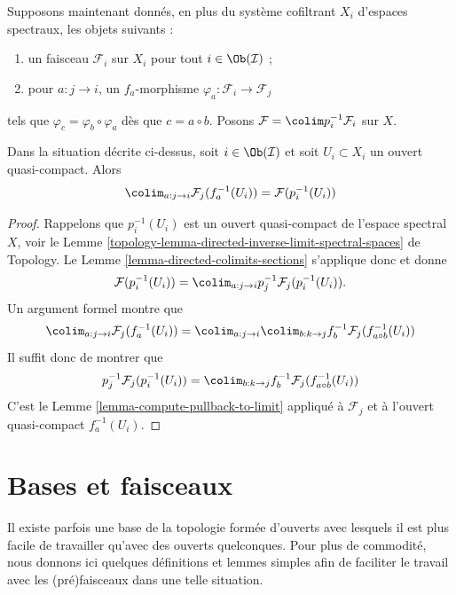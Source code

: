 \noindent
Supposons maintenant donnés, en plus du système cofiltrant $X_i$ d'espaces spectraux,
les objets suivants :
\begin{enumerate}
\item un faisceau $\mathcal{F}_i$ sur $X_i$ pour tout $i \in \Ob(\mathcal{I})$ ;
\item pour $a : j \to i$, un $f_a$-morphisme
$\varphi_a : \mathcal{F}_i \to \mathcal{F}_j$
\end{enumerate}
tels que $\varphi_c = \varphi_b \circ \varphi_a$
dès que $c = a \circ b$. Posons $\mathcal{F} = \colim p_i^{-1}\mathcal{F}_i$
sur $X$.

\begin{lemma}
\label{lemma-descend-opens}
Dans la situation décrite ci-dessus, soit $i \in \Ob(\mathcal{I})$ et soit
$U_i \subset X_i$ un ouvert quasi-compact. Alors
$$
\colim_{a : j \to i} \mathcal{F}_j(f_a^{-1}(U_i)) = \mathcal{F}(p_i^{-1}(U_i))
$$
\end{lemma}

\begin{proof}
Rappelons que $p_i^{-1}(U_i)$ est un ouvert quasi-compact de l'espace spectral
$X$, voir le
Lemme \ref{topology-lemma-directed-inverse-limit-spectral-spaces} de Topology.
Le Lemme \ref{lemma-directed-colimits-sections} s'applique donc et donne
$$
\mathcal{F}(p_i^{-1}(U_i)) =
\colim_{a : j \to i} p_j^{-1}\mathcal{F}_j(p_i^{-1}(U_i)).
$$
Un argument formel montre que
$$
\colim_{a : j \to i} \mathcal{F}_j(f_a^{-1}(U_i)) =
\colim_{a : j \to i} \colim_{b : k \to j}
f_b^{-1}\mathcal{F}_j(f_{a \circ b}^{-1}(U_i))
$$
Il suffit donc de montrer que
$$
p_j^{-1}\mathcal{F}_j(p_i^{-1}(U_i)) =
\colim_{b : k \to j} f_b^{-1}\mathcal{F}_j(f_{a \circ b}^{-1}(U_i))
$$
C'est le Lemme \ref{lemma-compute-pullback-to-limit}
appliqué à $\mathcal{F}_j$ et à l'ouvert quasi-compact $f_a^{-1}(U_i)$.
\end{proof}









\section{Bases et faisceaux}
\label{section-bases}

\noindent
Il existe parfois une base de la topologie
formée d'ouverts avec lesquels il est plus facile de travailler
qu'avec des ouverts quelconques. Pour plus de commodité, nous donnons ici
quelques définitions et lemmes simples afin de
faciliter le travail avec les (pré)faisceaux dans une telle situation.

